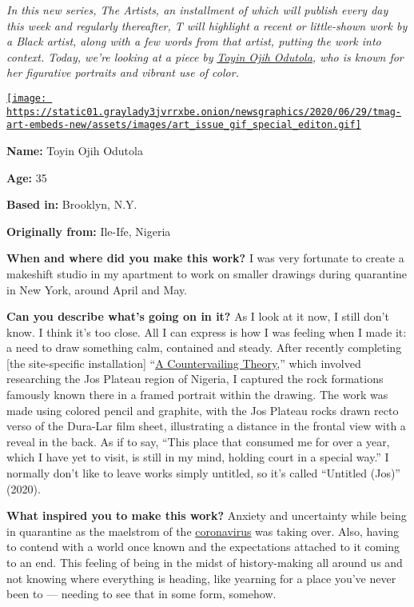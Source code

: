 \emph{In this new series, The Artists, an installment of which will
publish every day this week and regularly thereafter, T will highlight a
recent or little-shown work by a Black artist, along with a few words
from that artist, putting the work into context. Today, we're looking at
a piece by} \href{https://toyinojihodutola.com/}{\emph{Toyin Ojih
Odutola}}\emph{, who is known for her figurative portraits and vibrant
use of color.}

\href{https://www.nytimes3xbfgragh.onion/issue/t-magazine/2020/07/02/true-believers-art-issue}{\texttt{[image: https://static01.graylady3jvrrxbe.onion/newsgraphics/2020/06/29/tmag-art-embeds-new/assets/images/art\_issue\_gif\_special\_editon.gif]}}

\textbf{Name:} Toyin Ojih Odutola

\textbf{Age:} 35

\textbf{Based in:} Brooklyn, N.Y.

\textbf{Originally from:} Ile-Ife, Nigeria

\textbf{When and where did you make this work?} I was very fortunate to
create a makeshift studio in my apartment to work on smaller drawings
during quarantine in New York, around April and May.

\textbf{Can you describe what's going on in it?} As I look at it now, I
still don't know. I think it's too close. All I can express is how I was
feeling when I made it: a need to draw something calm, contained and
steady. After recently completing {[}the site-specific installation{]}
``\href{https://www.barbican.org.uk/our-story/press-room/toyin-ojih-odutola-a-countervailing-theory}{A
Countervailing Theory},'' which involved researching the Jos Plateau
region of Nigeria, I captured the rock formations famously known there
in a framed portrait within the drawing. The work was made using colored
pencil and graphite, with the Jos Plateau rocks drawn recto verso of the
Dura-Lar film sheet, illustrating a distance in the frontal view with a
reveal in the back. As if to say, ``This place that consumed me for over
a year, which I have yet to visit, is still in my mind, holding court in
a special way.'' I normally don't like to leave works simply untitled,
so it's called ``Untitled (Jos)'' (2020).

\textbf{What inspired you to make this work?} Anxiety and uncertainty
while being in quarantine as the maelstrom of the
\href{https://www.nytimes3xbfgragh.onion/news-event/coronavirus}{coronavirus}
was taking over. Also, having to contend with a world once known and the
expectations attached to it coming to an end. This feeling of being in
the midst of history-making all around us and not knowing where
everything is heading, like yearning for a place you've never been to
--- needing to see that in some form, somehow.

